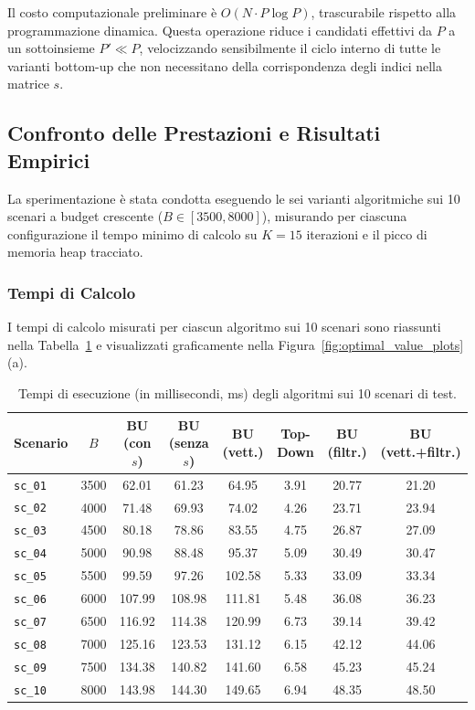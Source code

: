 Il costo computazionale preliminare è $O(N \cdot P \log P)$, trascurabile rispetto alla programmazione dinamica. Questa operazione riduce i candidati effettivi da $P$ a un sottoinsieme $P' \ll P$, velocizzando sensibilmente il ciclo interno di tutte le varianti bottom-up che non necessitano della corrispondenza degli indici nella matrice $s$.

\subsection{Confronto delle Prestazioni e Risultati Empirici}
La sperimentazione è stata condotta eseguendo le sei varianti algoritmiche sui 10 scenari a budget crescente ($B \in [3500, 8000]$), misurando per ciascuna configurazione il tempo minimo di calcolo su $K = 15$ iterazioni e il picco di memoria heap tracciato.

\subsubsection{Tempi di Calcolo}
I tempi di calcolo misurati per ciascun algoritmo sui 10 scenari sono riassunti nella Tabella~\ref{tab:execution_times} e visualizzati graficamente nella Figura~\ref{fig:optimal_value_plots}(a).

\begin{table}[!htbp]
	\centering
	\footnotesize
	\setlength{\tabcolsep}{4.5pt}
	\caption{Tempi di esecuzione (in millisecondi, ms) degli algoritmi sui 10 scenari di test.}
	\label{tab:execution_times}
	\begin{tabular}{lccccccc}
		\toprule
		\textbf{Scenario} & $B$ & \textbf{BU (con $s$)} & \textbf{BU (senza $s$)} & \textbf{BU (vett.)} & \textbf{Top-Down} & \textbf{BU (filtr.)} & \textbf{BU (vett.+filtr.)} \\
		\midrule
		\texttt{sc\_01} & 3500 & 62.01 & 61.23 & 64.95 & 3.91 & 20.77 & 21.20 \\
		\texttt{sc\_02} & 4000 & 71.48 & 69.93 & 74.02 & 4.26 & 23.71 & 23.94 \\
		\texttt{sc\_03} & 4500 & 80.18 & 78.86 & 83.55 & 4.75 & 26.87 & 27.09 \\
		\texttt{sc\_04} & 5000 & 90.98 & 88.48 & 95.37 & 5.09 & 30.49 & 30.47 \\
		\texttt{sc\_05} & 5500 & 99.59 & 97.26 & 102.58 & 5.33 & 33.09 & 33.34 \\
		\texttt{sc\_06} & 6000 & 107.99 & 108.98 & 111.81 & 5.48 & 36.08 & 36.23 \\
		\texttt{sc\_07} & 6500 & 116.92 & 114.38 & 120.99 & 6.73 & 39.14 & 39.42 \\
		\texttt{sc\_08} & 7000 & 125.16 & 123.53 & 131.12 & 6.15 & 42.12 & 44.06 \\
		\texttt{sc\_09} & 7500 & 134.38 & 140.82 & 141.60 & 6.58 & 45.23 & 45.24 \\
		\texttt{sc\_10} & 8000 & 143.98 & 144.30 & 149.65 & 6.94 & 48.35 & 48.50 \\
		\bottomrule
	\end{tabular}
\end{table}

